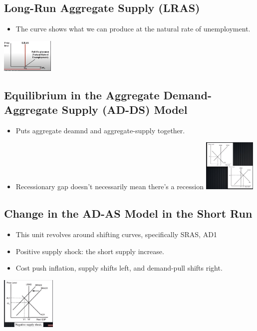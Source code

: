 \documentclass[8pt]{beamer}
\begin{document}
  \begin{frame}
	\section{Long-Run Aggregate Supply (LRAS)}
	\begin{itemize}
		\item The curve shows what we can produce at the natural rate of unemployment.
	\end{itemize}
	\includegraphics[width=2.5cm]{2021-10-12-12-18-10.png}
  \end{frame}
  \begin{frame}
	\section{Equilibrium in the Aggregate Demand-Aggregate Supply (AD-DS) Model}
	\begin{itemize}
		\item Puts aggregate deamnd and aggregate-supply together.
		\item Recessionary gap doesn't necessarily mean there's a recession
		\includegraphics[width=2.5cm]{2021-10-12-12-45-18.png}
	\end{itemize}
  \end{frame}
  \begin{frame}
	\section{Change in the AD-AS Model in the Short Run}
	\begin{itemize}
		\item This unit revolves around shifting curves, specifically SRAS, AD1
		\item Positive supply shock: the short supply increase.
		\item Cost push inflation, supply shifts left, and demand-pull shifts right.
	\end{itemize}
	\includegraphics[height=2.5cm]{2021-10-12-12-47-38.png}
  \end{frame}
\end{document}
